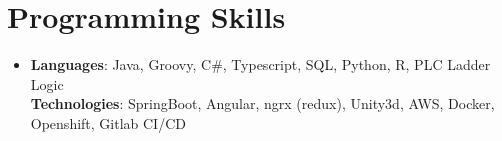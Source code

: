 \documentclass[letterpaper,11pt]{article}
\newcommand{\resumeSubHeadingListStart}{\begin{itemize}[leftmargin=*]}
\newcommand{\resumeSubHeadingListEnd}{\end{itemize}}
\begin{document}
\section{Programming Skills}
  \resumeSubHeadingListStart
    \item{
      \textbf{Languages}{: Java, Groovy, C\#, Typescript, SQL, Python, R, PLC Ladder Logic}
      \\
      \textbf{Technologies}{: SpringBoot, Angular, ngrx (redux), Unity3d, AWS, Docker, Openshift, Gitlab CI/CD}
    }
  \resumeSubHeadingListEnd


\end{document}
